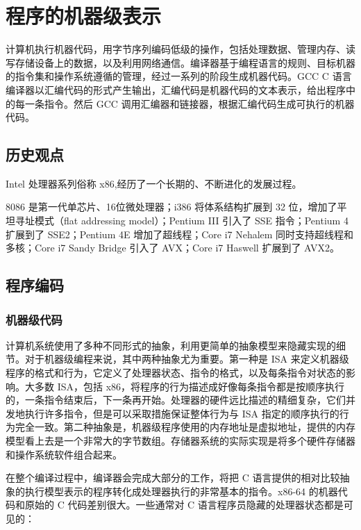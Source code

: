 \chapter{程序的机器级表示}

计算机执行机器代码，用字节序列编码低级的操作，包括处理数据、管理内存、读写存储设备上的数据，以及利用网络通信。编译器基于编程语言的规则、目标机器的指令集和操作系统遵循的管理，经过一系列的阶段生成机器代码。GCC C 语言编译器以汇编代码的形式产生输出，汇编代码是机器代码的文本表示，给出程序中的每一条指令。然后 GCC 调用汇编器和链接器，根据汇编代码生成可执行的机器代码。

\section{历史观点}

Intel 处理器系列俗称 x86,经历了一个长期的、不断进化的发展过程。

8086 是第一代单芯片、16位微处理器；i386 将体系结构扩展到 32 位，增加了平坦寻址模式（flat addressing model）；Pentium III 引入了 SSE 指令；Pentium 4 扩展到了 SSE2；Pentium 4E 增加了超线程；Core i7 Nehalem 同时支持超线程和多核；Core i7 Sandy Bridge 引入了 AVX；Core i7 Haswell 扩展到了 AVX2。

\section{程序编码}

\subsection{机器级代码}

计算机系统使用了多种不同形式的抽象，利用更简单的抽象模型来隐藏实现的细节。对于机器级编程来说，其中两种抽象尤为重要。第一种是 ISA 来定义机器级程序的格式和行为，它定义了处理器状态、指令的格式，以及每条指令对状态的影响。大多数 ISA，包括 x86，将程序的行为描述成好像每条指令都是按顺序执行的，一条指令结束后，下一条再开始。处理器的硬件远比描述的精细复杂，它们并发地执行许多指令，但是可以采取措施保证整体行为与 ISA 指定的顺序执行的行为完全一致。第二种抽象是，机器级程序使用的内存地址是虚拟地址，提供的内存模型看上去是一个非常大的字节数组。存储器系统的实际实现是将多个硬件存储器和操作系统软件组合起来。

在整个编译过程中，编译器会完成大部分的工作，将把 C 语言提供的相对比较抽象的执行模型表示的程序转化成处理器执行的非常基本的指令。x86-64 的机器代码和原始的 C 代码差别很大。一些通常对 C 语言程序员隐藏的处理器状态都是可见的：

